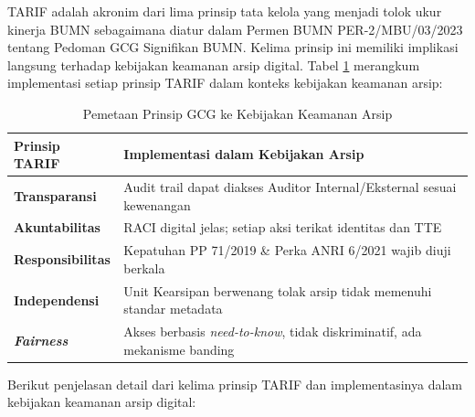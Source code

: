 \documentclass[12pt,a4paper]{report}
\begin{document}
TARIF adalah akronim dari lima prinsip tata kelola yang menjadi tolok ukur kinerja BUMN sebagaimana diatur dalam Permen BUMN PER-2/MBU/03/2023 tentang Pedoman GCG Signifikan BUMN. Kelima prinsip ini memiliki implikasi langsung terhadap kebijakan keamanan arsip digital. Tabel \ref{tab:pemetaan-gcg} merangkum implementasi setiap prinsip TARIF dalam konteks kebijakan keamanan arsip:

\begin{table}[htbp]
\centering
\small
\caption{Pemetaan Prinsip GCG ke Kebijakan Keamanan Arsip}
\label{tab:pemetaan-gcg}
\begin{tabularx}{\textwidth}{@{} l X @{}}
\toprule
\textbf{Prinsip TARIF} & \textbf{Implementasi dalam Kebijakan Arsip} \\
\midrule
\textbf{Transparansi} & Audit trail dapat diakses Auditor Internal/Eksternal sesuai kewenangan \\
\textbf{Akuntabilitas} & RACI digital jelas; setiap aksi terikat identitas dan TTE \\
\textbf{Responsibilitas} & Kepatuhan PP 71/2019 \& Perka ANRI 6/2021 wajib diuji berkala \\
\textbf{Independensi} & Unit Kearsipan berwenang tolak arsip tidak memenuhi standar metadata \\
\textbf{\textit{Fairness}} & Akses berbasis \textit{need-to-know}, tidak diskriminatif, ada mekanisme banding \\
\bottomrule
\end{tabularx}
\end{table}

Berikut penjelasan detail dari kelima prinsip TARIF dan implementasinya dalam kebijakan keamanan arsip digital:
\end{document}
